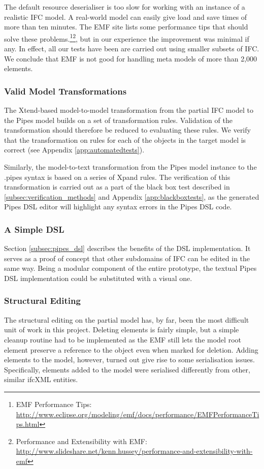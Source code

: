 The default resource deserialiser is too slow for working with an instance of a realistic IFC model. A real-world model can easily give load and save times of more than ten minutes. The EMF site lists some performance tips that should solve these problems.\footnote{EMF Performance Tips: \url{http://www.eclipse.org/modeling/emf/docs/performance/EMFPerformanceTips.html}}\footnote{Performance and Extensibility with EMF: \url{http://www.slideshare.net/kenn.hussey/performance-and-extensibility-with-emf}}, but in our experience the improvement was minimal if any. In effect, all our tests have been are carried out using smaller subsets of IFC. We conclude that EMF is not good for handling meta models of more than 2,000 elements.

\subsubsection{Valid Model Transformations} The Xtend-based model-to-model transformation from the partial IFC model to the Pipes model builds on a set of transformation rules. Validation of the transformation should therefore be reduced to evaluating these rules. We verify that the transformation on rules for each of the objects in the target model is correct (see Appendix \ref{app:automatedtests}).

Similarly, the model-to-text transformation from the Pipes model instance to the .pipes syntax is based on a series of Xpand rules. The verification of this transformation is carried out as a part of the black box test described in \ref{subsec:verification_methods} and Appendix \ref{app:blackboxtests}, as the generated Pipes DSL editor will highlight any syntax errors in the Pipes DSL code.

\subsubsection{A Simple DSL} Section \ref{subsec:pipes_dsl} describes the benefits of the DSL implementation. It serves as a proof of concept that other subdomains of IFC can be edited in the same way. Being a modular component of the entire prototype, the textual Pipes DSL implementation could be substituted with a visual one.

\subsubsection{Structural Editing} The structural editing on the partial model has, by far, been the most difficult unit of work in this project. Deleting elements is fairly simple, but a simple cleanup routine had to be implemented as the EMF still lets the model root element preserve a reference to the object even when marked for deletion. Adding elements to the model, however, turned out give rise to some serialisation issues. Specifically, elements added to the model were serialised differently from other, similar ifcXML entities.

